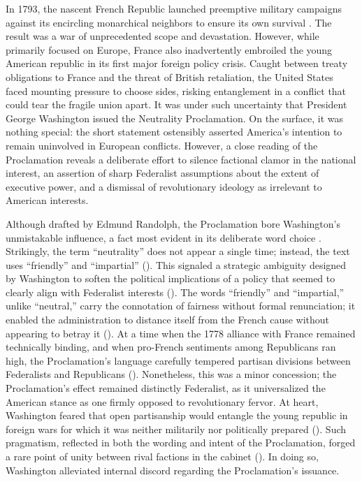

In 1793, the nascent French Republic launched preemptive military campaigns against its encircling monarchical neighbors to ensure its own survival \autocite{holland1911}. The result was a war of unprecedented scope and devastation. However, while primarily focused on Europe, France also inadvertently embroiled the young American republic in its first major foreign policy crisis. Caught between treaty obligations to France and the threat of British retaliation, the United States faced mounting pressure to choose sides, risking entanglement in a conflict that could tear the fragile union apart. It was under such uncertainty that President George Washington issued the Neutrality Proclamation. On the surface, it was nothing special: the short statement ostensibly asserted America’s intention to remain uninvolved in European conflicts. However, a close reading of the Proclamation reveals a deliberate effort to silence factional clamor in the national interest, an assertion of sharp Federalist assumptions about the extent of executive power, and a dismissal of revolutionary ideology as irrelevant to American interests. 

Although drafted by Edmund Randolph, the Proclamation bore Washington’s unmistakable influence, a fact most evident in its deliberate word choice \autocite[p.\ 59]{moats2021}. Strikingly, the term “neutrality” does not appear a single time; instead, the text uses “friendly” and “impartial” (\cite{washington1793}). This signaled a strategic ambiguity designed by Washington to soften the political implications of a policy that seemed to clearly align with Federalist interests (\cite[p.\ 71]{reinstein2011}). The words “friendly” and “impartial,” unlike “neutral,” carry the connotation of fairness without formal renunciation; it enabled the administration to distance itself from the French cause without appearing to betray it (\cite[p.\ 65]{moats2021}). At a time when the 1778 alliance with France remained technically binding, and when pro-French sentiments among Republicans ran high, the Proclamation’s language carefully tempered partisan divisions between Federalists and Republicans (\cite[p.\ 223, 215]{reinstein2011}). Nonetheless, this was a minor concession; the Proclamation’s effect remained distinctly Federalist, as it universalized the American stance as one firmly opposed to revolutionary fervor. At heart, Washington feared that open partisanship would entangle the young republic in foreign wars for which it was neither militarily nor politically prepared (\cite[pp.\ 470–471]{sheridan1994}). Such pragmatism, reflected in both the wording and intent of the Proclamation, forged a rare point of unity between rival factions in the cabinet (\cite[pp.\ 689–691]{chernow2011}). In doing so, Washington alleviated internal discord regarding the Proclamation’s issuance. 

